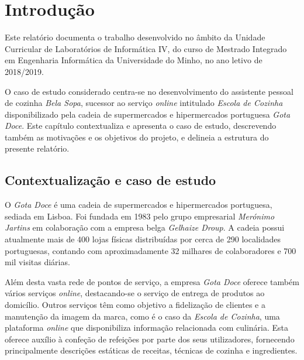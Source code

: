 
\section{Introdução}
\label{cap:introducao}

Este relatório documenta o trabalho desenvolvido no âmbito da Unidade Curricular de Laboratórios de Informática IV, do curso de Mestrado Integrado em Engenharia Informática da Universidade do Minho, no ano letivo de 2018/2019.

O caso de estudo considerado centra-se no desenvolvimento do assistente pessoal de cozinha \emph{Bela Sopa}, sucessor ao serviço \emph{online} intitulado \emph{Escola de Cozinha} disponibilizado pela cadeia de supermercados e hipermercados portuguesa \emph{Gota Doce}. Este capítulo contextualiza e apresenta o caso de estudo, descrevendo também as motivações e os objetivos do projeto, e delineia a estrutura do presente relatório.


\subsection{Contextualização e caso de estudo}
\label{sec:introducao:contextualizacao}

O \emph{Gota Doce} é uma cadeia de supermercados e hipermercados portuguesa, sediada em Lisboa. Foi fundada em 1983 pelo grupo empresarial \emph{Merónimo Jartins} em colaboração com a empresa belga \emph{Gelhaize Droup}. A cadeia possui atualmente mais de 400 lojas físicas distribuídas por cerca de 290 localidades portuguesas, contando com aproximadamente 32 milhares de colaboradores e 700 mil visitas diárias.

Além desta vasta rede de pontos de serviço, a empresa \emph{Gota Doce} oferece também vários serviços \emph{online}, destacando-se o serviço de entrega de produtos ao domicílio. Outros serviços têm como objetivo a fidelização de clientes e a manutenção da imagem da marca, como é o caso da \emph{Escola de Cozinha}, uma plataforma \emph{online} que disponibiliza informação relacionada com culinária. Esta oferece auxílio à confeção de refeições por parte dos seus utilizadores, fornecendo principalmente descrições estáticas de receitas, técnicas de cozinha e ingredientes.

